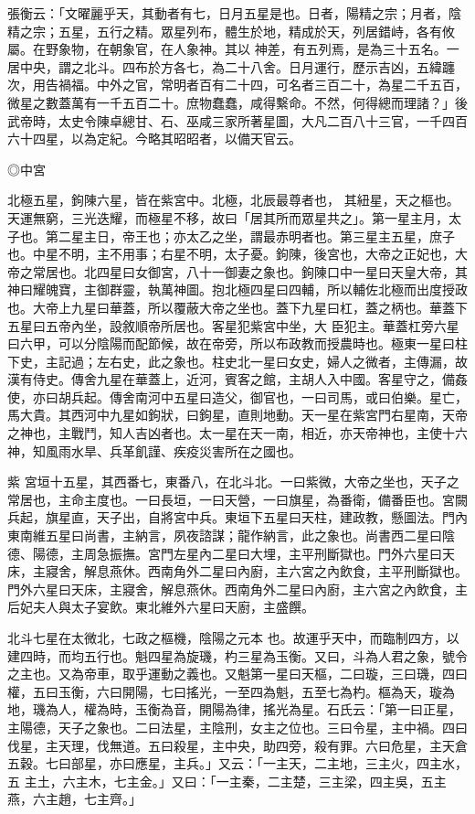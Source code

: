 \begin{pinyinscope}
{{ 張衡云：「文曜麗乎天，其動者有七，日月五星是也。日者，陽精之宗；月者，陰精之宗；五星，五行之精。眾星列布，體生於地，精成於天，列居錯峙，各有攸屬。在野象物，在朝象官，在人象神。其以
 神差，有五列焉，是為三十五名。一居中央，謂之北斗。四布於方各七，為二十八舍。日月運行，歷示吉凶，五緯躔次，用告禍福。中外之官，常明者百有二十四，可名者三百二十，為星二千五百，微星之數蓋萬有一千五百二十。庶物蠢蠢，咸得繫命。不然，何得總而理諸？」後武帝時，太史令陳卓總甘、石、巫咸三家所著星圖，大凡二百八十三官，一千四百六十四星，以為定紀。今略其昭昭者，以備天官云。



 ◎中宮



 北極五星，鉤陳六星，皆在紫宮中。北極，北辰最尊者也，
 其紐星，天之樞也。天運無窮，三光迭耀，而極星不移，故曰「居其所而眾星共之」。第一星主月，太子也。第二星主日，帝王也；亦太乙之坐，謂最赤明者也。第三星主五星，庶子也。中星不明，主不用事；右星不明，太子憂。鉤陳，後宮也，大帝之正妃也，大帝之常居也。北四星曰女御宮，八十一御妻之象也。鉤陳口中一星曰天皇大帝，其神曰耀魄寶，主御群靈，執萬神圖。抱北極四星曰四輔，所以輔佐北極而出度授政也。大帝上九星曰華蓋，所以覆蔽大帝之坐也。蓋下九星曰杠，蓋之柄也。華蓋下五星曰五帝內坐，設敘順帝所居也。客星犯紫宮中坐，大
 臣犯主。華蓋杠旁六星曰六甲，可以分陰陽而配節候，故在帝旁，所以布政教而授農時也。極東一星曰柱下史，主記過；左右史，此之象也。柱史北一星曰女史，婦人之微者，主傳漏，故漢有侍史。傳舍九星在華蓋上，近河，賓客之館，主胡人入中國。客星守之，備姦使，亦曰胡兵起。傳舍南河中五星曰造父，御官也，一曰司馬，或曰伯樂。星亡，馬大貴。其西河中九星如鉤狀，曰鉤星，直則地動。天一星在紫宮門右星南，天帝之神也，主戰鬥，知人吉凶者也。太一星在天一南，相近，亦天帝神也，主使十六神，知風雨水旱、兵革飢謹、疾疫災害所在之國也。



 紫
 宮垣十五星，其西番七，東番八，在北斗北。一曰紫微，大帝之坐也，天子之常居也，主命主度也。一曰長垣，一曰天營，一曰旗星，為番衛，備番臣也。宮闕兵起，旗星直，天子出，自將宮中兵。東垣下五星曰天柱，建政教，懸圖法。門內東南維五星曰尚書，主納言，夙夜諮謀；龍作納言，此之象也。尚書西二星曰陰德、陽德，主周急振撫。宮門左星內二星曰大埋，主平刑斷獄也。門外六星曰天床，主寢舍，解息燕休。西南角外二星曰內廚，主六宮之內飲食，主平刑斷獄也。門外六星曰天床，主寢舍，解息燕休。西南角外二星曰內廚，主六宮之內飲食，主后妃夫人與太子宴飲。東北維外六星曰天廚，主盛饌。



 北斗七星在太微北，七政之樞機，陰陽之元本
 也。故運乎天中，而臨制四方，以建四時，而均五行也。魁四星為旋璣，杓三星為玉衡。又曰，斗為人君之象，號令之主也。又為帝車，取乎運動之義也。又魁第一星曰天樞，二曰璇，三曰璣，四曰權，五曰玉衡，六曰開陽，七曰搖光，一至四為魁，五至七為杓。樞為天，璇為地，璣為人，權為時，玉衡為音，開陽為律，搖光為星。石氏云：「第一曰正星，主陽德，天子之象也。二曰法星，主陰刑，女主之位也。三曰令星，主中禍。四曰伐星，主天理，伐無道。五曰殺星，主中央，助四旁，殺有罪。六曰危星，主天倉五穀。七曰部星，亦曰應星，主兵。」又云：「一主天，二主地，三主火，四主水，五
 主土，六主木，七主金。」又曰：「一主秦，二主楚，三主梁，四主吳，五主燕，六主趙，七主齊。」



}}
\end{pinyinscope}

